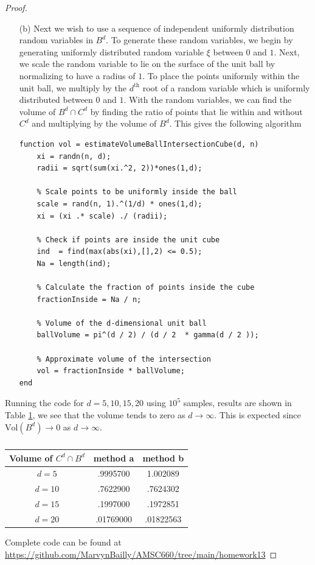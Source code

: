 \documentclass[12pt]{report}
\begin{document}
\begin{problem}
\begin{proof}
\begin{enumerate}
    \item [(b)] Next we wish to use a sequence of independent uniformly distribution random variables in $B^d$. To generate these random variables, we begin by generating uniformly distributed random variable $\xi$ between $0$ and $1$. Next, we scale the random variable to lie on the surface of the unit ball by normalizing to have a radius of $1$. To place the points uniformly within the unit ball, we multiply by the $d^\text{th}$ root of a random variable which is uniformly distributed between $0$ and $1$. With the random variables, we can find the volume of $B^d \cap C^d$ by finding the ratio of points that lie within and without $C^d$ and multiplying by the volume of $B^d$. This gives the following algorithm
    \begin{lstlisting}[style=Matlab-editor]
function vol = estimateVolumeBallIntersectionCube(d, n)
    xi = randn(n, d);
    radii = sqrt(sum(xi.^2, 2))*ones(1,d);

    % Scale points to be uniformly inside the ball
    scale = rand(n, 1).^(1/d) * ones(1,d);
    xi = (xi .* scale) ./ (radii);

    % Check if points are inside the unit cube
    ind  = find(max(abs(xi),[],2) <= 0.5);
    Na = length(ind);
    
    % Calculate the fraction of points inside the cube
    fractionInside = Na / n;

    % Volume of the d-dimensional unit ball
    ballVolume = pi^(d / 2) / (d / 2  * gamma(d / 2 ));
    
    % Approximate volume of the intersection
    vol = fractionInside * ballVolume;
end  
    \end{lstlisting} 
\end{enumerate}
Running the code for $d = 5,10,15,20$ using $10^{5}$ samples, results are shown in Table \ref{TABLLEEEE}, we see that the volume tends to zero as $d \to \infty$. This is expected since $\text{Vol}(B^d) \to 0$ as $d \to \infty$. 


\begin{table}[h!]
    \centering
    \begin{tabular}{c|c|c}
        Volume of $C^d \cap B^d$&  method a& method b \\ \hline
        $d = 5$&  .9995700 &  1.002089 \\
        $d = 10$&  .7622900 & .7624302  \\
        $d = 15$&  .1997000 &  .1972851 \\
        $d = 20$& .01769000 &  .01822563
    \end{tabular}
    \caption{}
    \label{TABLLEEEE}
\end{table}





\noindent
Complete code can be found at \url{https://github.com/MarvynBailly/AMSC660/tree/main/homework13}



\end{proof}
\end{problem}
\end{document}
